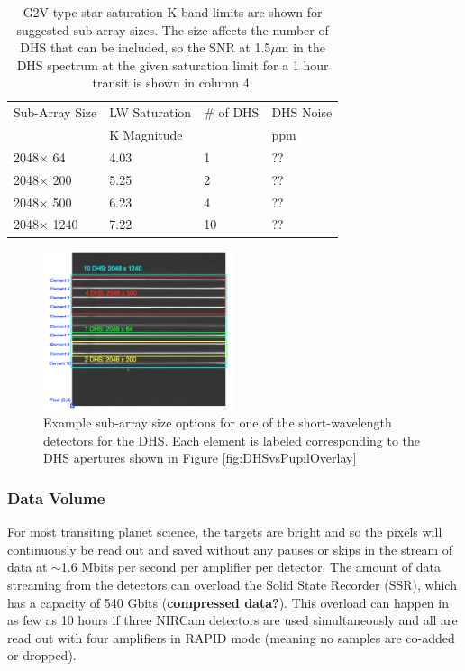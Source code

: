 \documentclass[iop]{emulateapj}
\begin{document}
\begin{table}
\centering
\begin{tabular}{llll}
Sub-Array Size &  LW Saturation & \# of DHS & DHS Noise\\
                         &  K Magnitude    &                               & ppm \\
\hline \hline
2048$\times$ 64 & 4.03 & 1 &  ?? \\
2048$\times$ 200 & 5.25 & 2 &  ?? \\
2048$\times$ 500 & 6.23 & 4 &  ?? \\
2048$\times$ 1240 & 7.22 & 10 & ??
\end{tabular}
\caption{G2V-type star saturation K band limits are shown for suggested sub-array sizes.
The size affects the number of DHS that can be included, so the SNR at 1.5$\mu$m in the DHS spectrum at the given saturation limit for a 1 hour transit is shown in column 4.}\label{tab:SatSNRsubA}
\end{table}

\begin{figure}[!ht]
\includegraphics[width=0.5\textwidth]{example_ap_sizes.png}
\caption{Example sub-array size options for one of the short-wavelength detectors for the DHS.
Each element is labeled corresponding to the DHS apertures shown in Figure \ref{fig:DHSvsPupilOverlay}}\label{fig:DHSaps}
\end{figure}

\subsubsection{Data Volume}
For most transiting planet science, the targets are bright and so the pixels will continuously be read out and saved without any pauses or skips in the stream of data at $\sim$1.6 Mbits per second per amplifier per detector.
The amount of data streaming from the detectors can overload the Solid State Recorder (SSR), which has a capacity of 540 Gbits \citep{johns2008L2comm} (\textbf{compressed data?}).
This overload can happen in as few as 10 hours if three NIRCam detectors are used simultaneously and all are read out with four amplifiers in RAPID mode (meaning no samples are co-added or dropped).
\end{document}

